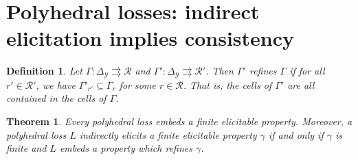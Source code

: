 \documentclass[12pt]{article}
\newcommand{\simplex}{\Delta_\Y}
\newcommand{\R}{\mathcal{R}}
\newcommand{\Y}{\mathcal{Y}}
\newcommand{\toto}{\rightrightarrows}
\newtheorem{theorem}{Theorem}
\newtheorem{definition}{Definition}
\begin{document}
\section{Polyhedral losses: indirect elicitation implies consistency}

\begin{definition}
	Let $\Gamma:\simplex \toto \R$ and $\Gamma':\simplex\toto \R'$.
	Then $\Gamma'$ \emph{refines} $\Gamma$ if for all $r' \in \R'$, we have $\Gamma'_{r'} \subseteq \Gamma_r$ for some $r \in \R$.
	That is, the cells of $\Gamma'$ are all contained in the cells of $\Gamma$.
\end{definition}

\begin{theorem}\label{thm:ie-iff-embeds-refinement}
	Every polyhedral loss embeds a finite elicitable property.
	Moreover, a polyhedral loss $L$ indirectly elicits a finite elicitable property $\gamma$ if and only if $\gamma$ is finite and $L$ embeds a property which refines $\gamma$.
\end{theorem}
\end{document}
